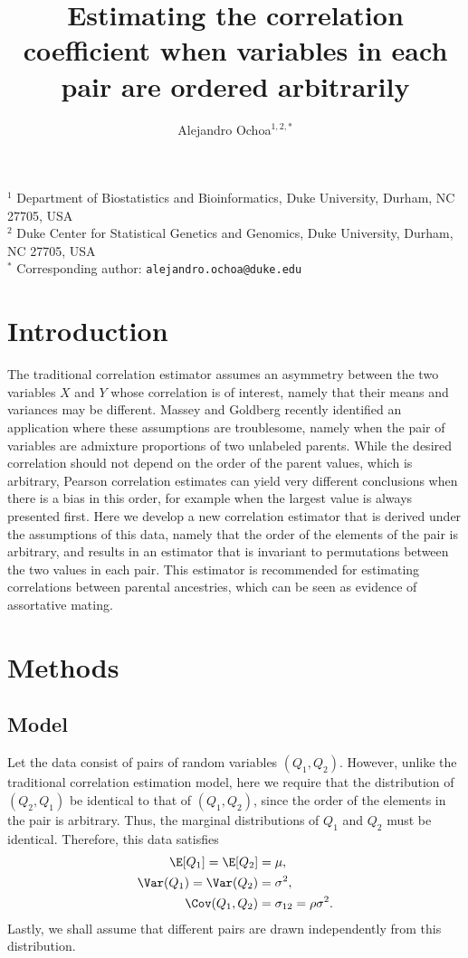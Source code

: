 \documentclass[11pt]{article}
\title{\Large \textbf{Estimating the correlation coefficient when variables in each pair are ordered arbitrarily}}
\author{Alejandro Ochoa$^{1,2,*}$}
\date{}
\begin{document}
\maketitle

\noindent
$^1$ Department of Biostatistics and Bioinformatics, Duke University, Durham, NC 27705, USA \\
$^2$ Duke Center for Statistical Genetics and Genomics, Duke University, Durham, NC 27705, USA \\
$^*$ Corresponding author: \texttt{alejandro.ochoa@duke.edu}



\section{Introduction}

The traditional correlation estimator assumes an asymmetry between the two variables $X$ and $Y$ whose correlation is of interest, namely that their means and variances may be different.
Massey and Goldberg recently identified an application where these assumptions are troublesome, namely when the pair of variables are admixture proportions of two unlabeled parents.
While the desired correlation should not depend on the order of the parent values, which is arbitrary, Pearson correlation estimates can yield very different conclusions when there is a bias in this order, for example when the largest value is always presented first.
Here we develop a new correlation estimator that is derived under the assumptions of this data, namely that the order of the elements of the pair is arbitrary, and results in an estimator that is invariant to permutations between the two values in each pair.
This estimator is recommended for estimating correlations between parental ancestries, which can be seen as evidence of assortative mating.

\section{Methods}

\subsection{Model}

Let the data consist of pairs of random variables $(Q_1, Q_2)$.
However, unlike the traditional correlation estimation model, here we require that the distribution of $(Q_2, Q_1)$ be identical to that of $(Q_1, Q_2)$, since the order of the elements in the pair is arbitrary.
Thus, the marginal distributions of $Q_1$ and $Q_2$ must be identical.
Therefore, this data satisfies
\begin{align*}
  \E[ Q_1 ] = \E[ Q_2 ] &= \mu, \\
  \Var( Q_1 ) = \Var( Q_2 ) &= \sigma^2, \\
  \Cov( Q_1, Q_2 ) &= \sigma_{12} = \rho \sigma^2.
\end{align*}
Lastly, we shall assume that different pairs are drawn independently from this distribution.
\end{document}
